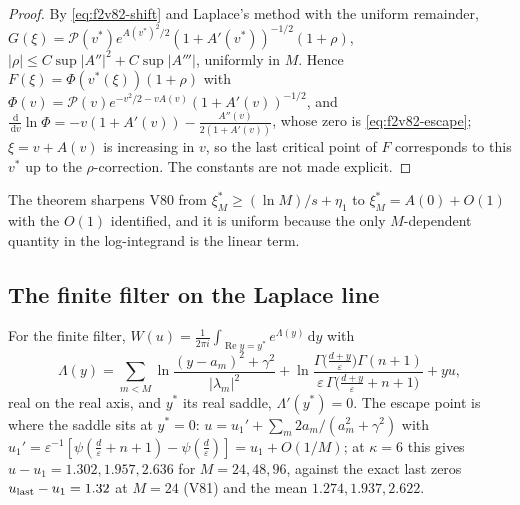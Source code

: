 \documentclass[11pt]{article}
\theoremstyle{definition}
\theoremstyle{remark}
\newcommand{\dd}{\,\mathrm d}
\begin{document}
\begin{proof}
By \eqref{eq:f2v82-shift} and Laplace's method with the uniform
remainder, \(G(\xi)=\mathcal P(v^*)e^{A(v^*)^2/2}(1+A'(v^*))^{-1/2}(1+\rho)\),
\(|\rho|\le C\sup|A''|^2+C\sup|A'''|\), uniformly in \(M\).  Hence
\(F(\xi)=\Phi(v^*(\xi))(1+\rho)\) with
\(\Phi(v)=\mathcal P(v)e^{-v^2/2-vA(v)}(1+A'(v))^{-1/2}\), and
\(\frac{\dd}{\dd v}\ln\Phi=-v(1+A'(v))-\frac{A''(v)}{2(1+A'(v))}\), whose
zero is \eqref{eq:f2v82-escape}; \(\xi=v+A(v)\) is increasing in \(v\),
so the last critical point of \(F\) corresponds to this \(v^*\) up to the
\(\rho\)-correction.  The constants are not made explicit.
\end{proof}

The theorem sharpens V80 from \(\xi^*_M\ge(\ln M)/s+\eta_1\) to
\(\xi^*_M=A(0)+O(1)\) with the \(O(1)\) identified, and it is uniform
because the only \(M\)-dependent quantity in the log-integrand is the
linear term.

\subsection{The finite filter on the Laplace line}

For the finite filter, \(W(u)=\frac1{2\pi i}\int_{\operatorname{Re}y=y^*}e^{\Lambda(y)}\dd y\)
with
\begin{equation}
 \Lambda(y)=\sum_{m<M}\ln\frac{(y-a_m)^2+\gamma^2}{|\lambda_m|^2}
 +\ln\frac{\Gamma\bigl(\tfrac{d+y}\varepsilon\bigr)\Gamma(n+1)}{\varepsilon\,\Gamma\bigl(\tfrac{d+y}\varepsilon+n+1\bigr)}+yu,
 \label{eq:f2v82-Lambda}
\end{equation}
real on the real axis, and \(y^*\) its real saddle, \(\Lambda'(y^*)=0\).
The escape point is where the saddle sits at \(y^*=0\):
\(u=u_1'+\sum_m2a_m/(a_m^2+\gamma^2)\) with
\(u_1'=\varepsilon^{-1}[\psi(\tfrac d\varepsilon+n+1)-\psi(\tfrac d\varepsilon)]=u_1+O(1/M)\);
at \(\kappa=6\) this gives \(u-u_1=1.302,1.957,2.636\) for
\(M=24,48,96\), against the exact last zeros \(u_{\rm last}-u_1=1.32\)
at \(M=24\) (V81) and the mean \(1.274,1.937,2.622\).
\end{document}
